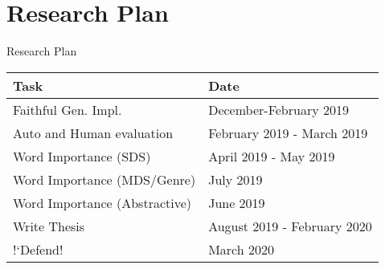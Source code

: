 \section{Research Plan}

\begin{frame}{Research Plan}
    \centering
\begin{tabular}{|ll|}
    \toprule
    \textbf{Task} & \textbf{Date} \\
    \midrule
     Faithful Gen. Impl. & December-February 2019\\
    \hline
    Auto and Human evaluation  & February 2019 - March 2019\\
    \hline
    Word Importance (SDS) &  April 2019 - May 2019 \\
    \hline
    Word Importance (MDS/Genre) & July 2019 \\
    \hline
    Word Importance (Abstractive) & June 2019 \\
    \hline
    Write Thesis & August 2019 - February 2020 \\
    \hline
    !`Defend! & March 2020 \\
    \bottomrule
\end{tabular}


\end{frame}

